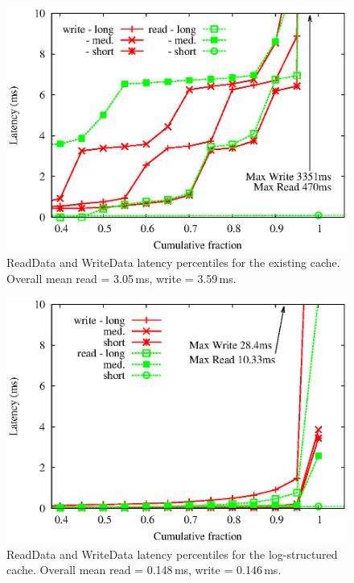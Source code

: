 \documentclass[letterpaper,twocolumn,10pt]{article}
\begin{document}
\begin{figure}
  \begin{center}
    \includegraphics[width=1.04\columnwidth]{graphs/disk-perf}
  \end{center}
  \caption{ReadData and WriteData latency percentiles for the existing
    cache. Overall mean read = 3.05\,ms, write = 3.59\,ms.}
  \label{fig:disk-perf} 
\vspace{-0.2in}
\end{figure}

\begin{figure}
  \begin{center}
    \includegraphics[width=1.04\columnwidth]{graphs/flash-perf}
  \end{center}
  \caption{ReadData and WriteData latency percentiles for the log-structured
    cache. Overall mean read = 0.148\,ms, write = 0.146\,ms.}
  \label{fig:flash-perf} 
\vspace{-0.2in}
\end{figure}
\end{document}
